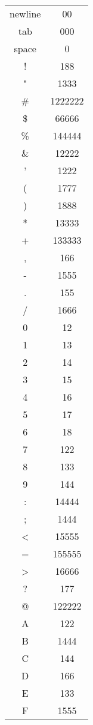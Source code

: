 \documentclass{article}
\begin{document}
\begin{multicols}{2}

\begin{supertabular}{|c|c|}
\centering
        newline & 00 \\
        tab & 000 \\
        space & 0 \\
        ! & 188 \\
        " & 1333 \\
        \# & 1222222 \\
        \$ & 66666 \\
        \% & 144444 \\
        \& & 12222 \\
        ' & 1222 \\
        ( & 1777 \\
        ) & 1888 \\
        * & 13333 \\
        + & 133333 \\
        , & 166 \\
        - & 1555 \\
        . & 155 \\
        / & 1666 \\
        0 & 12 \\
        1 & 13 \\
        2 & 14 \\
        3 & 15 \\
        4 & 16 \\
        5 & 17 \\
        6 & 18 \\
        7 & 122 \\
        8 & 133 \\
        9 & 144 \\
        : & 14444 \\
        ; & 1444 \\
        < & 15555 \\
        = & 155555 \\
        > & 16666 \\
        ? & 177 \\
        @ & 122222 \\
        A & 122 \\
        B & 1444 \\
        C & 144 \\
        D & 166 \\
        E & 133 \\
        F & 1555 \\

\end{supertabular}
\end{multicols}
\end{document}
